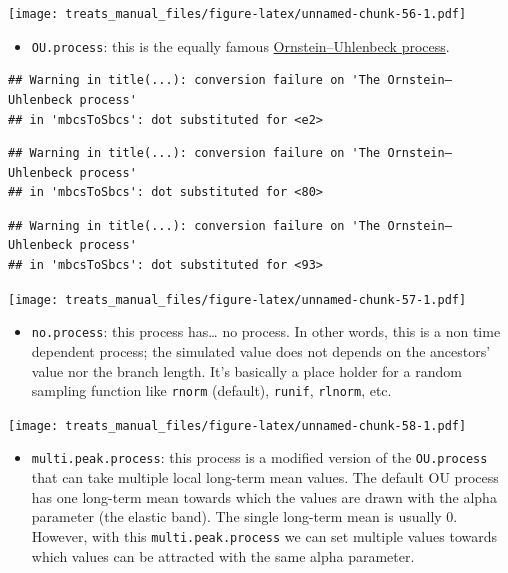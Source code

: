 \documentclass[
]{book}
\providecommand{\tightlist}{%
  \setlength{\itemsep}{0pt}\setlength{\parskip}{0pt}}
\begin{document}
\texttt{[image: treats\_manual\_files/figure-latex/unnamed-chunk-56-1.pdf]}

\begin{itemize}
\tightlist
\item
  \texttt{OU.process}: this is the equally famous \href{https://en.wikipedia.org/wiki/Ornstein\%E2\%80\%93Uhlenbeck_process}{Ornstein--Uhlenbeck process}.
\end{itemize}

\begin{verbatim}
## Warning in title(...): conversion failure on 'The Ornstein–Uhlenbeck process'
## in 'mbcsToSbcs': dot substituted for <e2>
\end{verbatim}

\begin{verbatim}
## Warning in title(...): conversion failure on 'The Ornstein–Uhlenbeck process'
## in 'mbcsToSbcs': dot substituted for <80>
\end{verbatim}

\begin{verbatim}
## Warning in title(...): conversion failure on 'The Ornstein–Uhlenbeck process'
## in 'mbcsToSbcs': dot substituted for <93>
\end{verbatim}

\texttt{[image: treats\_manual\_files/figure-latex/unnamed-chunk-57-1.pdf]}

\begin{itemize}
\tightlist
\item
  \texttt{no.process}: this process has\ldots{} no process. In other words, this is a non time dependent process; the simulated value does not depends on the ancestors' value nor the branch length. It's basically a place holder for a random sampling function like \texttt{rnorm} (default), \texttt{runif}, \texttt{rlnorm}, etc.
\end{itemize}

\texttt{[image: treats\_manual\_files/figure-latex/unnamed-chunk-58-1.pdf]}

\begin{itemize}
\tightlist
\item
  \texttt{multi.peak.process}: this process is a modified version of the \texttt{OU.process} that can take multiple local long-term mean values. The default OU process has one long-term mean towards which the values are drawn with the alpha parameter (the elastic band). The single long-term mean is usually 0. However, with this \texttt{multi.peak.process} we can set multiple values towards which values can be attracted with the same alpha parameter.
\end{itemize}
\end{document}

